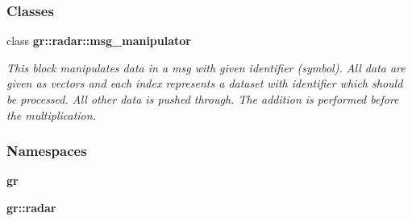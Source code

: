 \subsubsection*{Classes}
\begin{DoxyCompactItemize}
\item 
class {\bf gr\+::radar\+::msg\+\_\+manipulator}
\begin{DoxyCompactList}\small\item\em This block manipulates data in a msg with given identifier (symbol). All data are given as vectors and each index represents a dataset with identifier which should be processed. All other data is pushed through. The addition is performed before the multiplication. \end{DoxyCompactList}\end{DoxyCompactItemize}
\subsubsection*{Namespaces}
\begin{DoxyCompactItemize}
\item 
 {\bf gr}
\item 
 {\bf gr\+::radar}
\end{DoxyCompactItemize}
